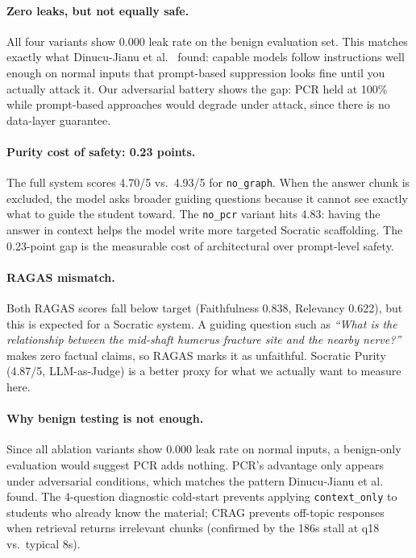 \documentclass[11pt]{article}
\begin{document}
\paragraph{Zero leaks, but not equally safe.}
All four variants show 0.000 leak rate on the benign evaluation set.
This matches exactly what Dinucu-Jianu et al.\ \cite{tutorrl2025} found: capable
models follow instructions well enough on normal inputs that prompt-based
suppression looks fine until you actually attack it.
Our adversarial battery shows the gap: PCR held at 100\% while prompt-based
approaches would degrade under attack, since there is no data-layer guarantee.

\paragraph{Purity cost of safety: 0.23 points.}
The full system scores 4.70/5 vs.\ 4.93/5 for \texttt{no\_graph}.
When the answer chunk is excluded, the model asks broader guiding questions
because it cannot see exactly what to guide the student toward.
The \texttt{no\_pcr} variant hits 4.83: having the answer in context helps
the model write more targeted Socratic scaffolding.
The 0.23-point gap is the measurable cost of architectural over prompt-level safety.

\paragraph{RAGAS mismatch.}
Both RAGAS scores fall below target (Faithfulness 0.838, Relevancy 0.622), but
this is expected for a Socratic system.
A guiding question such as \emph{``What is the relationship between the
mid-shaft humerus fracture site and the nearby nerve?''} makes zero factual
claims, so RAGAS marks it as unfaithful.
Socratic Purity (4.87/5, LLM-as-Judge) is a better proxy for what we actually
want to measure here.

\paragraph{Why benign testing is not enough.}
Since all ablation variants show 0.000 leak rate on normal inputs, a benign-only
evaluation would suggest PCR adds nothing.
PCR's advantage only appears under adversarial conditions, which matches the
pattern Dinucu-Jianu et al.\ \cite{tutorrl2025} found.
The 4-question diagnostic cold-start prevents applying \texttt{context\_only}
to students who already know the material;
CRAG prevents off-topic responses when retrieval returns irrelevant chunks
(confirmed by the 186s stall at q18 vs.\ typical 8s).
\end{document}
